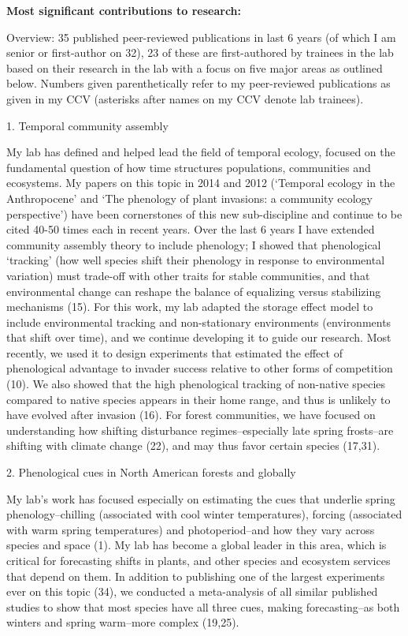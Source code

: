 \documentclass[12pt,oneside]{article}
\begin{document}
{\bf Most significant contributions to research:}

Overview: 35 published peer-reviewed publications in last 6 years (of which I am senior or first-author on 32), 23 of these are first-authored by trainees in the lab based on their research in the lab with a focus on five major areas as outlined below. Numbers given parenthetically refer to my peer-reviewed publications as given in my CCV (asterisks after names on my CCV denote lab trainees).
 
1. Temporal community assembly

My lab has defined and helped lead the field of temporal ecology, focused on the fundamental question of how time structures populations, communities and ecosystems. My papers on this topic in 2014 and 2012  (`Temporal ecology in the Anthropocene' and `The phenology of plant invasions: a community ecology perspective') have been cornerstones of this new sub-discipline and continue to be cited 40-50 times each in recent years. Over the last 6 years I have extended community assembly theory to include phenology; I showed that phenological `tracking' (how well species shift their phenology in response to environmental variation) must trade-off with other traits for stable communities, and that environmental change can reshape the balance of equalizing versus stabilizing mechanisms (15). For this work, my lab adapted the storage effect model to include environmental tracking and non-stationary environments (environments that shift over time), and we continue developing it to guide our research. Most recently, we used it to design experiments that estimated the effect of phenological advantage to invader success relative to other forms of competition (10). We also showed that the high phenological tracking of non-native species compared to native species appears in their home range, and thus is unlikely to have evolved after invasion (16). For forest communities, we have focused on understanding how shifting disturbance regimes--especially late spring frosts--are shifting with climate change (22), and may thus favor certain species (17,31).


2. Phenological cues in North American forests and globally

My lab's work has focused especially on estimating the cues that underlie spring phenology--chilling (associated with cool winter temperatures), forcing (associated with warm spring temperatures) and photoperiod--and how they vary across species and space (1). My lab has become a global leader in this area, which is critical for forecasting shifts in plants, and other species and ecosystem services that depend on them. In addition to publishing one of the largest experiments ever on this topic (34), we conducted a meta-analysis of all similar published studies to show that most species have all three cues, making forecasting--as both winters and spring warm--more complex (19,25). 
\end{document}
